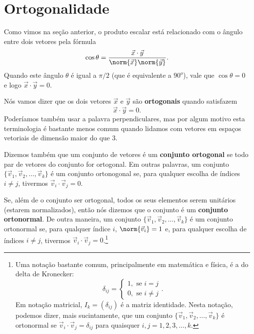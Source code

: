 \section{Ortogonalidade}

Como vimos na seção anterior, o produto escalar está relacionado com o ângulo entre dois vetores pela fórmula
\begin{equation}
\cos \theta = \frac{\vec{x} \cdot \vec{y}}{\norm{\vec{x}} \norm{\vec{y}}}.
\end{equation} Quando este ângulo $\theta$ é igual a $\pi /2$ (que é equivalente a $90^o$), vale que $\cos \theta = 0$ e logo $\vec{x} \cdot \vec{y} = 0$.

Nós vamos dizer que os dois vetores $\vec{x}$ e $\vec{y}$ são \textbf{ortogonais} quando satisfazem
\begin{equation}
\vec{x} \cdot \vec{y} = 0.
\end{equation} Poderíamos também usar a palavra perpendiculares, mas por algum motivo esta terminologia é bastante menos comum quando lidamos com vetores em espaços vetoriais de dimensão maior do que $3$.

Dizemos também que um conjunto de vetores é um \textbf{conjunto ortogonal} se todo par de vetores do conjunto for ortogonal. Em outras palavras, um conjunto $\{\vec{v}_1, \vec{v}_2, \dots, \vec{v}_k\}$ é um conjunto ortonogonal se, para qualquer escolha de índices $i \neq j$, tivermos $\vec{v}_i \cdot \vec{v}_j = 0$.

Se, além de o conjunto ser ortogonal, todos os seus elementos serem unitários (estarem normalizados), então nós dizemos que o conjunto é um \textbf{conjunto ortonormal}. De outra maneira, um conjunto $\{\vec{v}_1, \vec{v}_2, \dots, \vec{v}_k\}$ é um conjunto ortonormal se, para qualquer índice $i$, $\norm{\vec{v}_i} = 1$ e, para qualquer escolha de índices $i \neq j$, tivermos $\vec{v}_i \cdot \vec{v}_j = 0$.\footnote{Uma notação bastante comum, principalmente em matemática e física, é a do delta de Kronecker:\begin{equation} \delta_{ij} = \left\lbrace \begin{array}{l}
	1, \text{ se } i = j \\
	0, \text{ se } i \neq j
	\end{array} \right. . \end{equation} Em notação matricial, $I_k = (\delta_{ij})$ é a matriz identidade. Nesta notação, podemos dizer, mais sucintamente, que um conjunto $\{\vec{v}_1, \vec{v}_2, \dots, \vec{v}_k\}$ é ortonormal se $\vec{v}_i \cdot \vec{v}_j = \delta_{ij}$ para quaisquer $i,j = 1, 2, 3, \dots, k$.}

